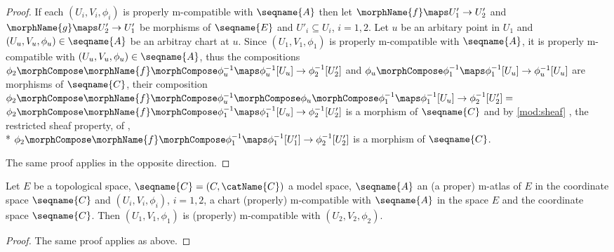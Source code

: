 \documentclass{article}
\begin{document}
\begin{lemma}
\begin{proof}
If each $(U_i,V_i,\phi_i)$ is properly m-compatible with $\seqname{A}$
then let
\nobreaks
  {{
    $\morphName{f} \maps U'_1 \to U'_2$
  }}
and
\nobreaks
  {{
    $\morphName{g} \maps U'_2 \to U'_1$
  }}
be morphisms of $\seqname{E}$ and $U'_i \subseteq U_i$, $i=1,2$.
Let $u$ be an arbitary point in $U_1$ and
\nobreaks
  {{
    $(U_u, V_u, \phi_u) \in \seqname{A}$
  }}
be an arbitray chart at $u$. Since
\nobreaks
  {{
    $(U_1,V_1,\phi_1)$
  }}
is properly m-compatible with $\seqname{A}$,
it is properly m-compatible with
\nobreaks
  {{
    $(U_u, V_u, \phi_u) \in \seqname{A}$,
  }}
thus the compositions
\nobreaks
  {{
    $
      \phi_2 \morphCompose \morphName{f} \morphCompose \phi^{-1}_u
      \maps \phi^{-1}_u[U_u] \to \phi^{-1}_2[U'_2]
    $
  }}
and
\nobreaks
  {{
    $
      \phi_u \morphCompose \phi^{-1}_1
      \maps \phi^{-1}_1[U_u] \to \phi^{-1}_u[U_u]
    $
  }}
are morphisms of $\seqname{C}$, their composition
\nobreaks
  {{
    $
      \phi_2 \morphCompose \morphName{f} \morphCompose \phi^{-1}_u \morphCompose
      \phi_u \morphCompose \phi^{-1}_1
      \maps \phi^{-1}_1[U_u] \to \phi^{-1}_2[U'_2] =
    $
  }}
\nobreaks
  {{
    $
      \phi_2 \morphCompose \morphName{f} \morphCompose \phi^{-1}_1
      \maps \phi^{-1}_1[U_u] \to \phi^{-1}_2[U'_2]
    $
  }}
is a morphism of $\seqname{C}$ and by
{
  \showlabelsinline
  \cref{mod:sheaf}
},
the restricted sheaf property, of , \\*
\nobreaks
  {{
    $
      \phi_2 \morphCompose \morphName{f} \morphCompose \phi^{-1}_1
      \maps \phi^{-1}_1[U'_1] \to \phi^{-1}_2[U'_2]
    $
  }}
is a morphism of $\seqname{C}$.

The same proof applies in the opposite direction.
\end{proof}

Let $E$ be a topological space, $\seqname{C}=(C,\catName{C})$ a model
space, $\seqname{A}$ an (a proper) m-atlas of $E$ in the coordinate
space $\seqname{C}$ and $(U_i, V_i, \phi_i)$, $i=1,2$, a chart
(properly) m-compatible with $\seqname{A}$ in the space $E$ and the
coordinate space $\seqname{C}$.  Then $(U_1, V_1, \phi_1)$ is (properly)
m-compatible with $(U_2, V_2, \phi_2)$.

\begin{proof}
The same proof applies as above.
\end{proof}
\end{lemma}
\end{document}
